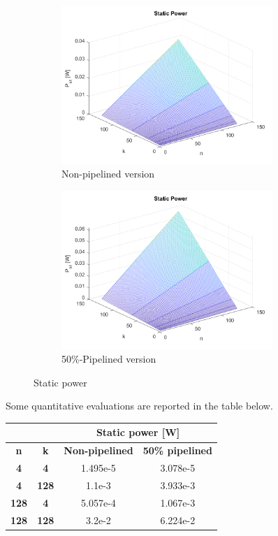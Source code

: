\begin{figure}[H]
{	}
	{
		\begin{subfigure}{0.55\textwidth}
			\includegraphics[width=8cm]{immagini/radix2ppipe0/p_static3D.png}
			\caption{Non-pipelined version}
		\end{subfigure}
		\begin{subfigure}{0.55\textwidth}
			\includegraphics[width=8cm]{immagini/radix2ppipe2/p_static3D.png}
			\caption{50\%-Pipelined version}
		\end{subfigure}
	}
	\caption{Static power}
	\label{fig:pstat}
\end{figure}

Some quantitative evaluations are reported in the table below.

\begin{center}
	\begin{tabular}{cc|c|c|}
		\cline{3-4}
		\multicolumn{1}{l}{}               & \multicolumn{1}{l|}{} & \multicolumn{2}{c|}{\textbf{Static power {[}W{]}}} \\ \hline
		\multicolumn{1}{|c|}{\textbf{n}}   & \textbf{k}            & \textbf{Non-pipelined}  & \textbf{50\% pipelined} \\ \hline
		\multicolumn{1}{|c|}{\textbf{4}}   & \textbf{4}            & 1.495e-5                & 3.078e-5                \\ \hline
		\multicolumn{1}{|c|}{\textbf{4}}   & \textbf{128}          & 1.1e-3                  & 3.933e-3                \\ \hline
		\multicolumn{1}{|c|}{\textbf{128}} & \textbf{4}            & 5.057e-4                & 1.067e-3                \\ \hline
		\multicolumn{1}{|c|}{\textbf{128}} & \textbf{128}          & 3.2e-2                  & 6.224e-2                \\ \hline
	\end{tabular}
\end{center}

